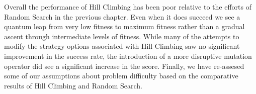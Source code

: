 Overall the performance of Hill Climbing has been poor relative to the efforts of Random Search in the previous chapter. Even when it does succeed we see a quantum leap from very low fitness to maximum fitness rather than a gradual ascent through intermediate levels of fitness. While many of the attempts to modify the strategy options associated with Hill Climbing saw no significant improvement in the success rate, the introduction of a more disruptive mutation operator did see a significant increase in the score. Finally, we have re-assesed some of our assumptions about problem difficulty based on the comparative results of Hill Climbing and Random Search.






















































